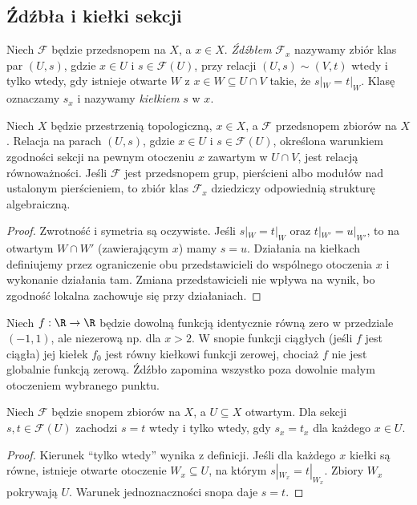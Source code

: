 \subsection{Źdźbła i kiełki sekcji}
\begin{definicja}[Źdźbło]
\label{def:stalk}
Niech $\mathcal F$ będzie przedsnopem na $X$,
a $x\in X$. \emph{Źdźbłem} $\mathcal F_x$
nazywamy zbiór klas par $(U,s)$, gdzie $x\in U$
i $s\in\mathcal F(U)$, przy relacji
$(U,s)\sim(V,t)$ wtedy i tylko wtedy, gdy istnieje
otwarte $W$ z $x\in W\subseteq U\cap V$
takie, że $s|_W=t|_W$. Klasę oznaczamy $s_x$
i nazywamy \emph{kiełkiem} $s$ w $x$.
\end{definicja}

\begin{stwierdzenie}
Niech $X$ będzie przestrzenią topologiczną, $x\in X$,
a $\mathcal F$ przedsnopem zbiorów na $X$. Relacja na
parach $(U,s)$, gdzie $x\in U$ i $s\in\mathcal F(U)$,
określona warunkiem zgodności sekcji na pewnym otoczeniu
$x$ zawartym w $U\cap V$, jest relacją równoważności.
Jeśli $\mathcal F$ jest przedsnopem grup, pierścieni albo
modułów nad ustalonym pierścieniem, to zbiór klas
$\mathcal F_x$ dziedziczy odpowiednią strukturę algebraiczną.
\end{stwierdzenie}
\begin{proof}
Zwrotność i symetria są oczywiste. Jeśli
$s|_W=t|_W$ oraz $t|_{W'}=u|_{W'}$, to
na otwartym $W\cap W'$ (zawierającym $x$)
mamy $s=u$. Działania na kiełkach definiujemy
przez ograniczenie obu przedstawicieli do
wspólnego otoczenia $x$ i wykonanie działania tam.
Zmiana przedstawicieli nie wpływa na wynik,
bo zgodność lokalna zachowuje się przy działaniach.
\end{proof}

\begin{przyklad}
Niech $f:\R\to\R$ będzie dowolną funkcją
identycznie równą zero w przedziale $(-1,1)$,
ale niezerową np. dla $x>2$. W snopie funkcji
ciągłych (jeśli $f$ jest ciągła) jej kiełek
$f_0$ jest równy kiełkowi funkcji zerowej,
chociaż $f$ nie jest globalnie funkcją zerową.
Źdźbło zapomina wszystko poza dowolnie małym
otoczeniem wybranego punktu.
\end{przyklad}

\begin{twierdzenie}
\label{tw:germ-zero}
Niech $\mathcal F$ będzie snopem zbiorów na $X$,
a $U\subseteq X$ otwartym. Dla sekcji
$s,t\in\mathcal F(U)$ zachodzi $s=t$ wtedy
i tylko wtedy, gdy $s_x=t_x$ dla każdego $x\in U$.
\end{twierdzenie}
\begin{proof}
Kierunek ``tylko wtedy'' wynika z definicji.
Jeśli dla każdego $x$ kiełki są równe,
istnieje otwarte otoczenie $W_x\subseteq U$, na
którym $s|_{W_x}=t|_{W_x}$. Zbiory $W_x$ pokrywają $U$.
Warunek jednoznaczności snopa daje $s=t$.
\end{proof}

